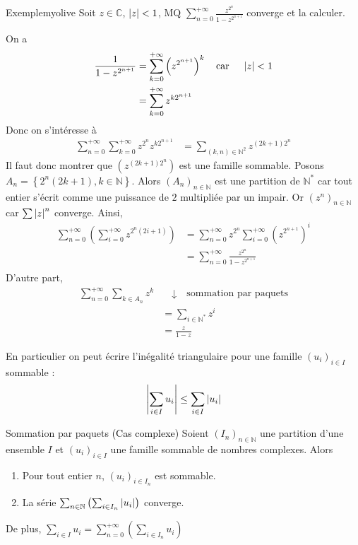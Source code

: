     \begin{omed}{Exemple}{myolive}
        Soit $z \in \mathbb{C}$, $\left\lvert z\right\rvert < 1$, MQ $\sum_{n = 0}^{+\infty} \frac{z^{2^n}}{1 - z^{2^{n+1}}}$ converge et la calculer.

        On a 
        \begin{align*}
            \frac{1}{1 - z^{2^{n+1}}} &= \sum_{k=0}^{+\infty} \left(z^{2^{n+1}}\right)^k \quad \text{car } \quad \left\lvert z\right\rvert < 1 \\
            &= \sum_{k=0}^{+\infty} z^{k 2^{n+1}}
        \end{align*}
        Donc on s’intéresse à 
        \begin{align*}
            \sum_{n = 0}^{+\infty} \sum_{k = 0}^{+\infty} z^{2^n} z^{k 2^{n+1}} 
            &= \sum_{(k,n) \in \mathbb{N}^2} z^{(2k+1)2^n}
        \end{align*}
        Il faut donc montrer que $(z^{(2k+1)2^n})$ est une famille sommable. Posons $A_n = \left\{2^n (2k+1), k \in \mathbb{N}\right\}$. Alors $(A_n)_{n \in \mathbb{N}}$ est une partition de $\mathbb{N}^*$ car tout entier s’écrit comme une puissance de $2$ multipliée par un impair. Or $(z^n)_{n \in \mathbb{N}}$ car $\sum \left\lvert z\right\rvert^n$ converge. Ainsi, 
        \begin{align*}
            \sum_{n=0}^{+\infty} \left(\sum_{i = 0}^{+\infty} z^{2^n (2i + 1)}\right) 
            &= \sum_{n=0}^{+\infty}z^{2^n} \sum_{i = 0}^{+\infty} (z^{2^{n+1}})^i \\
            &= \sum_{n=0}^{+\infty} \frac{z^{2^n}}{1 - z^{2^{n+1}}} \\
        \end{align*}
        D’autre part, 
        \begin{align*}
            \sum_{n=0}^{+\infty} \sum_{k \in A_n} z^k &\quad \downarrow \quad \text{sommation par paquets} \\
            &= \sum_{i \in \mathbb{N}^*} z^i \\
            &= \frac{z}{1 - z}
        \end{align*}
    \end{omed}

    En particulier on peut écrire l’inégalité triangulaire pour une famille $(u_i)_{i \in I}$ sommable : 
    \[ \left\lvert \sum_{i \in I} u_i\right\rvert \leq \sum_{i \in I} \left\lvert u_i\right\rvert \] 

    \begin{theo}{Sommation par paquets \textcolor{black}{(Cas complexe)}}{}
        Soient $(I_n)_{n \in \mathbb{N}}$ une partition d’une ensemble $I$ et $(u_i)_{i \in I}$ une famille sommable de nombres complexes. Alors 
        \begin{enumerate}
            \item Pour tout entier $n$, $(u_i)_{i \in I_n}$ est sommable.
            \item La série $\sum_{n \in \mathbb{N}} \left(\sum_{i \in I_n} \left\lvert u_i\right\rvert\right)$ converge.
        \end{enumerate}
        De plus, $\sum_{i \in I} u_i = \sum_{n = 0}^{+\infty} \left(\sum_{i \in I_n} u_i\right)$
    \end{theo}

